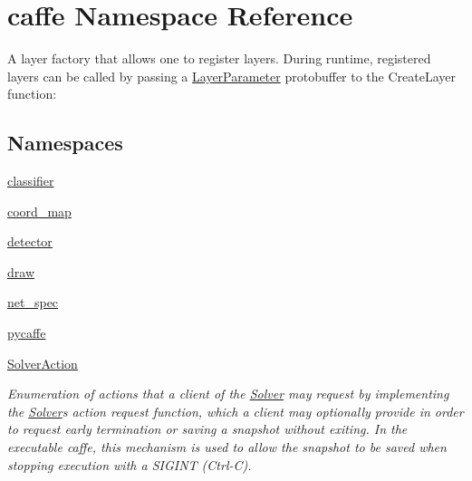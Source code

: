 \hypertarget{namespacecaffe}{}\section{caffe Namespace Reference}
\label{namespacecaffe}


A layer factory that allows one to register layers. During runtime, registered layers can be called by passing a \mbox{\hyperlink{classcaffe_1_1_layer_parameter}{Layer\+Parameter}} protobuffer to the Create\+Layer function\+:  


\subsection*{Namespaces}
\begin{DoxyCompactItemize}
\item 
 \mbox{\hyperlink{namespacecaffe_1_1classifier}{classifier}}
\item 
 \mbox{\hyperlink{namespacecaffe_1_1coord__map}{coord\+\_\+map}}
\item 
 \mbox{\hyperlink{namespacecaffe_1_1detector}{detector}}
\item 
 \mbox{\hyperlink{namespacecaffe_1_1draw}{draw}}
\item 
 \mbox{\hyperlink{namespacecaffe_1_1net__spec}{net\+\_\+spec}}
\item 
 \mbox{\hyperlink{namespacecaffe_1_1pycaffe}{pycaffe}}
\item 
 \mbox{\hyperlink{namespacecaffe_1_1_solver_action}{Solver\+Action}}
\begin{DoxyCompactList}\small\item\em Enumeration of actions that a client of the \mbox{\hyperlink{classcaffe_1_1_solver}{Solver}} may request by implementing the \mbox{\hyperlink{classcaffe_1_1_solver}{Solver}}\textquotesingle{}s action request function, which a client may optionally provide in order to request early termination or saving a snapshot without exiting. In the executable caffe, this mechanism is used to allow the snapshot to be saved when stopping execution with a S\+I\+G\+I\+NT (Ctrl-\/C). \end{DoxyCompactList}\end{DoxyCompactItemize}
